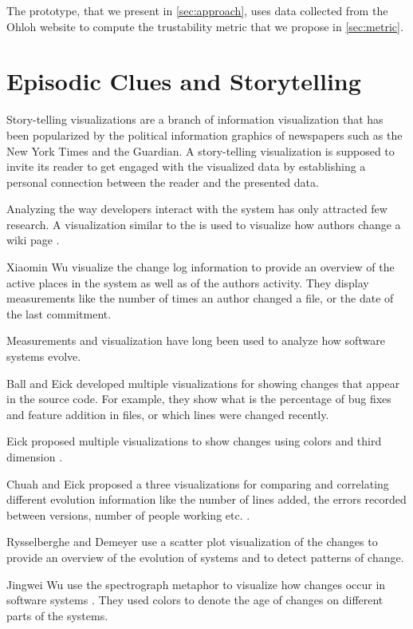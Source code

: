 The \Jbd prototype, that we present in \autoref{sec:approach}, uses data collected from the Ohloh website to compute the trustability metric that we propose in \autoref{sec:metric}.

\section{Episodic Clues and Storytelling}

Story-telling visualizations are a branch of information visualization that has been popularized by the political information graphics of newspapers such as the New York Times and the Guardian. A story-telling visualization is supposed to invite its reader to get engaged with the visualized data by establishing a personal connection between the reader and the presented data. 

Analyzing the way developers interact with the system has only attracted few research. A visualization similar to the \omap is used to visualize how authors change a wiki page \cite{Vieg04a}.

Xiaomin Wu \etal visualize \cite{Wu04b} the change log information to provide an overview of the active places in the system as well as of the authors activity. They display measurements like the number of times an author changed a file, or the date of the last commitment.

Measurements and visualization have long been used to analyze how software systems evolve.

Ball and Eick \cite{Ball96a} developed multiple visualizations for showing changes that appear in the source code. For example, they show what is the percentage of bug fixes and feature addition in files, or which lines were changed recently.

Eick \etal proposed multiple visualizations to show changes using colors and third dimension \cite{Eick02a}.

Chuah and Eick proposed a three visualizations for comparing and correlating different evolution information like the number of lines added, the errors recorded between versions, number of people working etc. \cite{Chua98a}.

Rysselberghe and Demeyer use a scatter plot visualization of the changes  to provide an overview of the evolution of systems and to detect patterns of change\cite{Ryss04a}.

Jingwei Wu \etal use the spectrograph metaphor to visualize how changes occur in software systems \cite{Wu04a}. They used colors to denote the age of changes on different parts of the systems.

